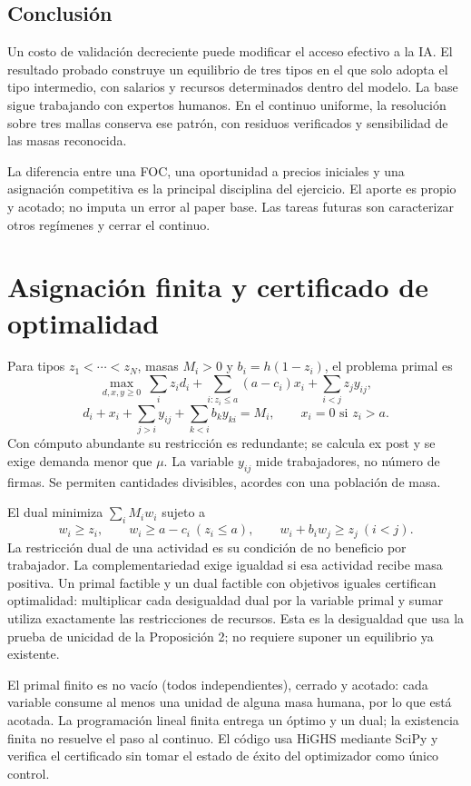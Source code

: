 \documentclass[11pt]{article}
\begin{document}
\subsection{Conclusión}
Un costo de validación decreciente puede modificar el acceso efectivo a la IA. El resultado probado construye un equilibrio de tres tipos en el que solo adopta el tipo intermedio, con salarios y recursos determinados dentro del modelo. La base sigue trabajando con expertos humanos. En el continuo uniforme, la resolución sobre tres mallas conserva ese patrón, con residuos verificados y sensibilidad de las masas reconocida.

La diferencia entre una FOC, una oportunidad a precios iniciales y una asignación competitiva es la principal disciplina del ejercicio. El aporte es propio y acotado; no imputa un error al paper base. Las tareas futuras son caracterizar otros regímenes y cerrar el continuo.
\label{body:end}
\newpage

\newpage\appendix
\section{Asignación finita y certificado de optimalidad}
Para tipos $z_1<\cdots<z_N$, masas $M_i>0$ y $b_i=h(1-z_i)$, el problema primal es
\[
\max_{d,x,y\geq0}\ \sum_i z_i d_i+\sum_{i:z_i\leq a}(a-c_i)x_i+\sum_{i<j}z_jy_{ij},
\]
\[
d_i+x_i+\sum_{j>i}y_{ij}+\sum_{k<i}b_ky_{ki}=M_i,\qquad
x_i=0\text{ si }z_i>a.
\]
Con cómputo abundante su restricción es redundante; se calcula ex post y se exige demanda menor que $\mu$. La variable $y_{ij}$ mide trabajadores, no número de firmas. Se permiten cantidades divisibles, acordes con una población de masa.

El dual minimiza $\sum_iM_iw_i$ sujeto a
\[
w_i\geq z_i,\qquad w_i\geq a-c_i\ (z_i\leq a),\qquad w_i+b_iw_j\geq z_j\ (i<j).
\]
La restricción dual de una actividad es su condición de no beneficio por trabajador. La complementariedad exige igualdad si esa actividad recibe masa positiva. Un primal factible y un dual factible con objetivos iguales certifican optimalidad: multiplicar cada desigualdad dual por la variable primal y sumar utiliza exactamente las restricciones de recursos. Esta es la desigualdad que usa la prueba de unicidad de la Proposición 2; no requiere suponer un equilibrio ya existente.

El primal finito es no vacío (todos independientes), cerrado y acotado: cada variable consume al menos una unidad de alguna masa humana, por lo que está acotada. La programación lineal finita entrega un óptimo y un dual; la existencia finita no resuelve el paso al continuo. El código usa HiGHS mediante SciPy y verifica el certificado sin tomar el estado de éxito del optimizador como único control.
\end{document}
